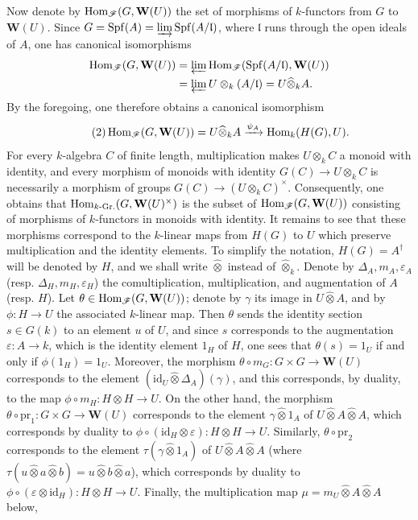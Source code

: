 Now denote by $\operatorname{Hom}_{\mathscr F}(G,\mathbf W(U))$ the set of morphisms of $k$-functors from $G$ to $\mathbf W(U)$. Since $G=\operatorname{Spf}(A)=\varinjlim\operatorname{Spf}(A/\mathfrak l)$, where $\mathfrak l$ runs through the open ideals of $A$, one has canonical isomorphisms
\[
\begin{aligned}
\operatorname{Hom}_{\mathscr F}(G,\mathbf W(U))&=\varprojlim\operatorname{Hom}_{\mathscr F}(\operatorname{Spf}(A/\mathfrak l),\mathbf W(U))\\
&=\varprojlim U\otimes_k(A/\mathfrak l)=U\widehat\otimes_k A.
\end{aligned}
\]
By the foregoing, one therefore obtains a canonical isomorphism
\begin{equation}\tag{2}
\operatorname{Hom}_{\mathscr F}(G,\mathbf W(U))=U\widehat\otimes_k A\xrightarrow{\psi_A}\operatorname{Hom}_k(H(G),U).
\end{equation}
For every $k$-algebra $C$ of finite length, multiplication makes $U\otimes_k C$ a monoid with identity, and every morphism of monoids with identity $G(C)\to U\otimes_k C$ is necessarily a morphism of groups $G(C)\to(U\otimes_k C)^\times$. Consequently, one obtains that $\operatorname{Hom}_{k\text{-}\mathrm{Gr.}}(G,\mathbf W(U)^\times)$ is the subset of $\operatorname{Hom}_{\mathscr F}(G,\mathbf W(U))$ consisting of morphisms of $k$-functors in monoids with identity.
It remains to see that these morphisms correspond to the $k$-linear maps from $H(G)$ to $U$ which preserve multiplication and the identity elements. To simplify the notation, $H(G)=A^\dagger$ will be denoted by $H$, and we shall write $\widehat\otimes$ instead of $\widehat\otimes_k$. Denote by $\Delta_A,m_A,\varepsilon_A$ (resp. $\Delta_H,m_H,\varepsilon_H$) the comultiplication, multiplication, and augmentation of $A$ (resp. $H$). Let $\theta\in\operatorname{Hom}_{\mathscr F}(G,\mathbf W(U))$; denote by $\gamma$ its image in $U\widehat\otimes A$, and by $\phi:H\to U$ the associated $k$-linear map. Then $\theta$ sends the identity section $s\in G(k)$ to an element $u$ of $U$, and since $s$ corresponds to the augmentation $\varepsilon:A\to k$, which is the identity element $1_H$ of $H$, one sees that $\theta(s)=1_U$ if and only if $\phi(1_H)=1_U$.
Moreover, the morphism $\theta\circ m_G:G\times G\to\mathbf W(U)$ corresponds to the element $(\mathrm{id}_U\widehat\otimes\Delta_A)(\gamma)$, and this corresponds, by duality, to the map $\phi\circ m_H:H\otimes H\to U$.
On the other hand, the morphism $\theta\circ\mathrm{pr}_1:G\times G\to\mathbf W(U)$ corresponds to the element $\gamma\widehat\otimes1_A$ of $U\widehat\otimes A\widehat\otimes A$, which corresponds by duality to $\phi\circ(\mathrm{id}_H\otimes\varepsilon):H\otimes H\to U$. Similarly, $\theta\circ\mathrm{pr}_2$ corresponds to the element $\tau(\gamma\widehat\otimes1_A)$ of $U\widehat\otimes A\widehat\otimes A$ (where $\tau(u\widehat\otimes a\widehat\otimes b)=u\widehat\otimes b\widehat\otimes a$), which corresponds by duality to $\phi\circ(\varepsilon\otimes\mathrm{id}_H):H\otimes H\to U$. Finally, the multiplication map $\mu=m_U\widehat\otimes A\widehat\otimes A$ below,
